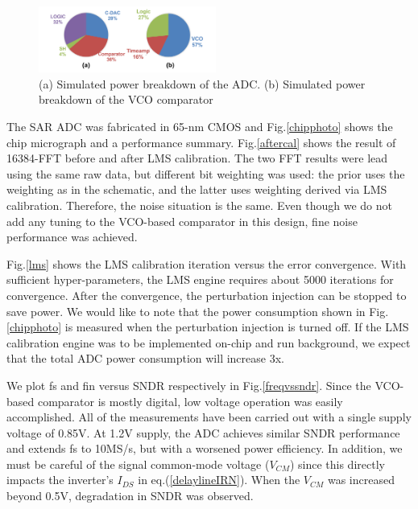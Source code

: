 \documentclass[journal]{IEEEtran}
\begin{document}
\begin{figure}[!t]
\centering
 \includegraphics[width=0.52\textwidth]{figs/breakdown.png}
 \caption{(a) Simulated power breakdown of the ADC. (b) Simulated power breakdown of the VCO comparator}
  \label{power}
\end{figure}

The SAR ADC was fabricated in 65-nm CMOS and Fig.\ref{chipphoto} shows the chip micrograph and a performance summary. 
Fig.\ref{aftercal} shows the result of 16384-FFT before and after LMS calibration. The two FFT results were lead using the same raw data, but different bit weighting was used: the prior uses the weighting as in the schematic, and the latter uses weighting derived via LMS calibration. Therefore, the noise situation is the same. Even though we do not add any tuning to the VCO-based comparator in this design, fine noise performance was achieved. 

Fig.\ref{lms} shows the LMS calibration iteration versus the error convergence. With sufficient hyper-parameters, the LMS engine requires about 5000 iterations for convergence. After the convergence, the perturbation injection can be stopped to save power. 
We would like to note that the power consumption shown in Fig.\ref{chipphoto} is measured when the perturbation injection is turned off. If the LMS calibration engine was to be implemented on-chip and run background, we expect that the total ADC power consumption will increase 3x. 

We plot fs and fin versus SNDR respectively in Fig.\ref{freqvssndr}. Since the VCO-based comparator is mostly digital, low voltage operation was easily accomplished. All of the measurements have been carried out with a single supply voltage of 0.85V. At 1.2V supply, the ADC achieves similar SNDR performance and extends fs to 10MS/s, but with a worsened power efficiency. In addition, we must be careful of the signal common-mode voltage ($V_{CM}$) since this directly impacts the inverter’s $I_{DS}$ in eq.(\ref{delaylineIRN}). When the $V_{CM}$ was increased beyond 0.5V, degradation in SNDR was observed.
\end{document}
